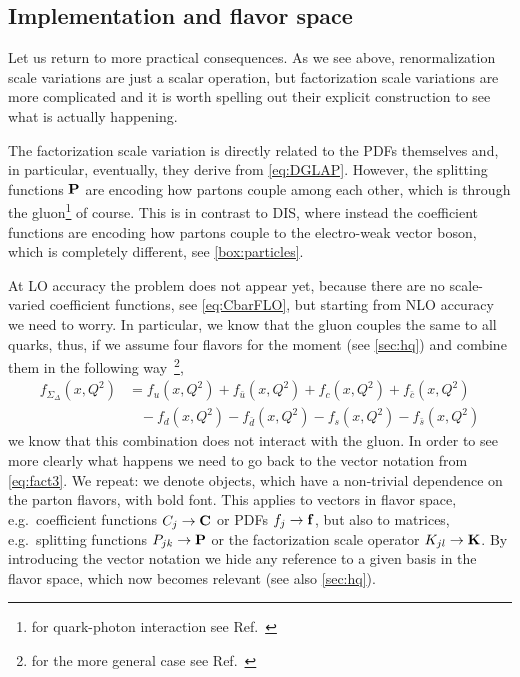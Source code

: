 
\subsection{Implementation and flavor space}
\label{sec:svimpl}
Let us return to more practical consequences.
As we see above, renormalization scale variations are just a scalar operation, but factorization scale variations are more complicated and it is worth spelling out their explicit construction to see what is actually happening.

The factorization scale variation is directly related to the PDFs themselves and, in particular, eventually, they derive from \cref{eq:DGLAP}.
However, the splitting functions $\vb P$ are encoding how partons couple among each other, which is through the gluon\footnote{for quark-photon interaction see Ref.~\cite{NNPDF:2024djq}} of course.
This is in contrast to DIS, where instead the coefficient functions are encoding how partons couple to the electro-weak vector boson, which is completely different, see \cref{box:particles}.

At LO accuracy the problem does not appear yet, because there are no scale-varied coefficient functions, see \cref{eq:CbarFLO}, but starting from NLO accuracy we need to worry.
In particular, we know that the gluon couples the same to all quarks, thus, if we assume four flavors for the moment (see \cref{sec:hq}) and combine them in the following way~\cite{NNPDF:2024djq}\footnote{for the more general case see Ref.~\cite{NNPDF:2024djq}},
\begin{align}
    f_{\Sigma_\Delta}(x,Q^2) &= f_u(x,Q^2) + f_{\bar u}(x,Q^2) + f_c(x,Q^2) + f_{\bar c}(x,Q^2)\nonumber\\
    & \hspace{10pt} - f_d(x,Q^2) - f_{\bar d}(x,Q^2) - f_s(x,Q^2) - f_{\bar s}(x,Q^2)  \label{eq:SigmaDelta}
\end{align}
we know that this combination does not interact with the gluon.
In order to see more clearly what happens we need to go back to the vector notation from \cref{eq:fact3}.
We repeat: we denote objects, which have a non-trivial dependence on the parton flavors, with bold font.
This applies to vectors in flavor space, e.g.\ coefficient functions $C_j \to \vb C$ or PDFs $f_j \to \vb f$, but also to matrices, e.g.\ splitting functions $P_{jk} \to \vb P$ or the factorization scale operator $K_{jl}\to \vb K$.
By introducing the vector notation we hide any reference to a given basis in the flavor space, which now becomes relevant (see also \cref{sec:hq}).

